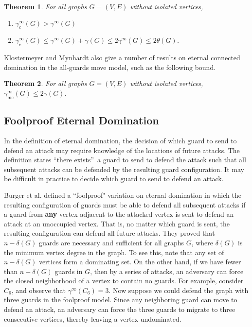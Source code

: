 \documentclass[12pt]{article}%
\newtheorem{theorem}{Theorem}[section]
\begin{document}
\begin{theorem}
\emph{\cite{KM4}\hspace{0.1in}}For all graphs $G=(V,E)$ without isolated vertices,

\begin{enumerate}
\item[\emph{(a)}] $\gamma_{c}^{\infty}(G)>\gamma^{\infty}(G)$

\item[\emph{(b)}] $\gamma_{c}^{\infty}(G)\leq\gamma^{\infty}(G)+\gamma
(G)\leq2\gamma^{\infty}(G)\leq2\theta(G)$.
\end{enumerate}
\end{theorem}

Klostermeyer and Mynhardt also give a number of results on eternal connected
domination \cite{KM4} in the all-guards move model, such as the following bound.

\begin{theorem}
\emph{\cite{KM4}}\hspace{0.1in}For all graphs $G=(V,E)$ without isolated
vertices, $\gamma_{\mathrm{\operatorname{mc}}}^{\infty}(G)\leq2\gamma(G)$.
\end{theorem}

\subsection{Foolproof Eternal Domination}

In the definition of eternal domination, the decision of which guard to send
to defend an attack may require knowledge of the locations of future attacks.
The definition states \textquotedblleft there exists\textquotedblright\ a
guard to send to defend the attack such that all subsequent attacks can be
defended by the resulting guard configuration. It may be difficult in practice
to decide which guard to send to defend an attack.

Burger et al. \cite{BCG2} defined a \textquotedblleft foolproof" variation on
eternal domination in which the resulting configuration of guards must be able
to defend all subsequent attacks if a guard from \textbf{{any}} vertex
adjacent to the attacked vertex is sent to defend an attack at an unoccupied
vertex. That is, no matter which guard is sent, the resulting configuration
can defend all future attacks. They proved that $n-\delta(G)$ guards are
necessary and sufficient for all graphs $G$, where $\delta(G)$ is the minimum
vertex degree in the graph. To see this, note that any set of $n-\delta(G)$
vertices form a dominating set. On the other hand, if we have fewer than
$n-\delta(G)$ guards in $G$, then by a series of attacks, an adversary can
force the closed neighborhood of a vertex to contain no guards. For example,
consider $C_{6}$, and observe that $\gamma^{\infty}(C_{6})=3$. Now suppose we
could defend the graph with three guards in the foolproof model. Since any
neighboring guard can move to defend an attack, an adversary can force the
three guards to migrate to three consecutive vertices, thereby leaving a
vertex undominated.
\end{document}
